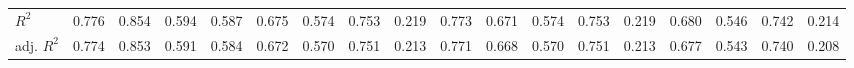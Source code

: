 \begin{table}[htbp]
\begin{tabular}{l*{17}{c}}
\(R^{2}\)   &       0.776         &       0.854         &       0.594         &       0.587         &       0.675         &       0.574         &       0.753         &       0.219         &       0.773         &       0.671         &       0.574         &       0.753         &       0.219         &       0.680         &       0.546         &       0.742         &       0.214         \\
adj. \(R^{2}\)&       0.774         &       0.853         &       0.591         &       0.584         &       0.672         &       0.570         &       0.751         &       0.213         &       0.771         &       0.668         &       0.570         &       0.751         &       0.213         &       0.677         &       0.543         &       0.740         &       0.208         \\
\hline\hline
\end{tabular}
\end{table}
